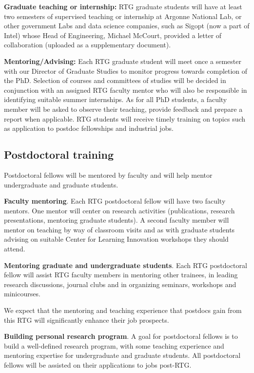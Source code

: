 \documentclass[11pt]{NSFamsart}
\begin{document}
 
\noindent
\textbf{Graduate teaching or internship:}
RTG graduate students will have at least two semesters of supervised teaching or internship at Argonne National Lab, or other government Labs and data science companies, such as     Sigopt (now a part of Intel) whose Head of Engineering, Michael McCourt, provided a letter  of collaboration (uploaded as a supplementary document).


\noindent
\textbf{Mentoring/Advising:} Each RTG graduate student will meet once a semester with our Director of Graduate
Studies to monitor progress towards completion of the PhD. Selection of courses and committees of studies
will be decided in conjunction with an assigned RTG faculty mentor who will also be responsible in identifying
suitable summer internships.   As for all PhD students, a faculty member will be asked to observe their
teaching, provide feedback and prepare a report when applicable. RTG students will receive timely training
on topics such as application to postdoc fellowships and industrial jobs.
 


\subsection{Postdoctoral training}
 Postdoctoral fellows will be mentored by faculty 
 and will help mentor undergraduate and graduate students. 


\noindent
\textbf{Faculty mentoring}. Each RTG postdoctoral fellow will have two faculty mentors. One mentor will center on research activities
(publications, research presentations, mentoring graduate students). A second faculty member will
mentor on teaching by way of classroom visits and as with graduate students advising on suitable Center for Learning Innovation workshops they should attend. 

\noindent
\textbf{Mentoring graduate  and undergraduate students}. Each RTG postdoctoral fellow will assist RTG faculty members in mentoring 
other trainees, in leading research discussions, journal clubs and
in organizing seminars, workshops and minicourses. 
 
We expect that the mentoring and teaching experience that postdocs gain from this RTG will significantly enhance their job prospects.   

 
 \noindent
\textbf{Building personal research program}. A goal for postdoctoral fellows is to   build a well-defined research program, with some teaching experience and mentoring expertise for undergraduate and graduate students.  All postdoctoral fellows will be assisted on their applications to jobs post-RTG.
\end{document}

